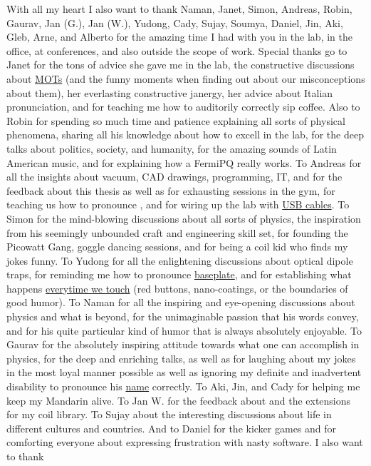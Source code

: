 \begin{minipage}{\textwidth}
With all my heart I also want to thank Naman, Janet, Simon, Andreas, Robin, Gaurav, Jan (G.), Jan (W.), Yudong, Cady, Sujay, Soumya, Daniel, Jin, Aki, Gleb, Arne, and Alberto for the amazing time I had with you in the lab, in the office, at conferences, and also outside the scope of work. Special thanks go to Janet for the tons of advice she gave me in the lab, the constructive discussions about \href{https://www.spencersmot.co.uk/wp-content/uploads/2021/08/AdobeStock_322578000-1024x819.jpeg}{MOTs} (and the funny moments when finding out about our misconceptions about them), her everlasting constructive janergy, her advice about Italian pronunciation, and for teaching me how to auditorily correctly sip coffee. Also to Robin for spending so much time and patience explaining all sorts of physical phenomena, sharing all his knowledge about how to excell in the lab, for the deep talks about politics, society, and humanity, for the amazing sounds of Latin American music, and for explaining how a FermiPQ really works. To Andreas for all the insights about vacuum, CAD drawings, programming, IT, and for the feedback about this thesis as well as for exhausting sessions in the gym, for teaching us how to pronounce \href{https://www.youtube.com/watch?v=_3_JVVs2Kls}{\GaUsS}, and for wiring up the lab with \href{https://soundcloud.com/schatturus/usb-cable-1/s-Fyd3wafUQub?si=9655280d540d4f4b88e9b6aca0bb6602&utm_source=clipboard&utm_medium=text&utm_campaign=social_sharing}{USB cables}. To Simon for the mind-blowing discussions about all sorts of physics, the inspiration from his seemingly unbounded craft and engineering skill set, for founding the Picowatt Gang, goggle dancing sessions, and for being a coil kid who finds my jokes funny.  To Yudong for all the enlightening discussions about optical dipole traps, for reminding me how to pronounce \href{https://soundcloud.com/schatturus/baseplate/s-zBKCu5GdivC?si=674fdd5e94994e409cc93763e37c101e&utm_source=clipboard&utm_medium=text&utm_campaign=social_sharing}{baseplate}, and for establishing what happens \href{https://youtu.be/4G6QDNC4jPs?t=33}{everytime we touch} (red buttons, nano-coatings, or the boundaries of good humor). To Naman for all the inspiring and eye-opening discussions about physics and what is beyond, for the unimaginable passion that his words convey, and for his quite particular kind of humor that is always absolutely enjoyable. To Gaurav for the absolutely inspiring attitude towards what one can accomplish in physics, for the deep and enriching talks, as well as for laughing about my jokes in the most loyal manner possible as well as ignoring my definite and inadvertent disability to pronounce his \href{https://upload.wikimedia.org/wikipedia/commons/c/c7/Rothschild%27s_Giraffe_%28Giraffa_camelopardalis_rothschildi%29_male_%287068054987%29%2C_crop_%26_edit.jpg}{name} correctly. To Aki, Jin, and Cady for helping me keep my Mandarin alive. To Jan W. for the feedback about and the extensions for my coil library. To Sujay about the interesting discussions about life in different cultures and countries. And to Daniel for the kicker games and for comforting everyone about expressing frustration with nasty software. I also want to thank 
\end{minipage}
